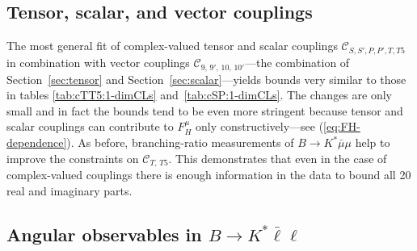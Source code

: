 \documentclass[twocolumn,epjc3]{svjour3}
\numberwithin{equation}{section}
\def \refeq#1{(\ref{#1})}
\def \refsec#1{Section~\ref{#1}}
\newcommand{\wilson}[2][{}]{\mathcal{C}_{#2}^{\mathrm{#1}}}
\renewcommand{\[}{\big[}
\renewcommand{\]}{\big]}
\renewcommand{\(}{\big(}
\renewcommand{\)}{\big)}
\begin{document}
%
%
\subsection{Tensor, scalar, and vector couplings \label{sec:tensor:scalar}}

The most general fit of complex-valued tensor and scalar couplings
$\wilson{S,S',P,P',T,T5}$ in combination with vector couplings
$\wilson{9,\,9',\,10,\, 10'}$---the combination of \refsec{sec:tensor} and
\refsec{sec:scalar}---yields bounds very similar to those in tables
\ref{tab:cTT5:1-dimCLs} and~\ref{tab:cSP:1-dimCLs}. The changes are only small
and in fact the bounds tend to be even more stringent because tensor and scalar
couplings can contribute to $F_H^{\mu}$ only constructively---see
\refeq{eq:FH-dependence}.  As before, branching-ratio measurements of $B\to
K^{*}\bar\mu\mu$ help to improve the constraints on $\wilson{T,\, T5}$. This
demonstrates that even in the case of complex-valued couplings there is enough
information in the data to bound all 20 real and imaginary parts.

%
%
\subsection{Angular observables in $B\to K^* \bar\ell\ell$}
\end{document}
